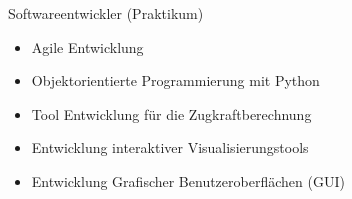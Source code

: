 Softwareentwickler (Praktikum)
\begin{itemize}
	\item Agile Entwicklung
	\item Objektorientierte Programmierung mit Python
	\item Tool Entwicklung für die Zugkraftberechnung
	\item Entwicklung interaktiver Visualisierungstools
	\item Entwicklung Grafischer Benutzeroberflächen (GUI)
\end{itemize}
\SmallSep
